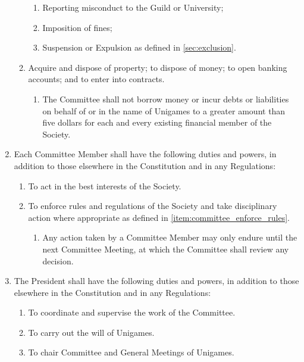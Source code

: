 \documentclass[a4paper]{article}
\begin{document}
\begin{enumerate}
\begin{enumerate}
\begin{enumerate}
                        \item Reporting misconduct to the Guild or University;
                        \item Imposition of fines;
                        \item Suspension or Expulsion as defined in \cref{sec:exclusion}.
                    \end{enumerate}
              \item Acquire and dispose of property; to dispose of money; to open banking accounts; and to enter into contracts.
                    \begin{enumerate}
                        \item The Committee shall not borrow money or incur debts or liabilities on behalf of or in the name of Unigames to a greater amount than five dollars for each and every existing financial member of the Society.
                    \end{enumerate}
          \end{enumerate}
    \item Each Committee Member shall have the following duties and powers, in addition to those elsewhere in the Constitution and in any Regulations:
          \begin{enumerate}
              \item To act in the best interests of the Society.
              \item To enforce rules and regulations of the Society and take disciplinary action where appropriate as defined in \cref{item:committee_enforce_rules}.
                    \begin{enumerate}
                        \item Any action taken by a Committee Member may only endure until the next Committee Meeting, at which the Committee shall review any decision.
                    \end{enumerate}
          \end{enumerate}
    \item \label{item:pres_duties} The President shall have the following duties and powers, in addition to those elsewhere in the Constitution and in any Regulations:
          \begin{enumerate}
              \item To coordinate and supervise the work of the Committee.
              \item To carry out the will of Unigames.
              \item To chair Committee and General Meetings of Unigames.

\end{enumerate}
\end{enumerate}
\end{document}
